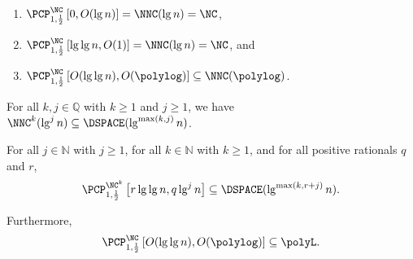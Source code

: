 \documentclass[]{article}
\newcommand{\PCPcs}[5]{\PCP^{#1}_{#2, #3}\left[#4, #5\right]}
\begin{document}
\begin{corollary}
  \mbox{}
  \begin{enumerate}
  \item $\PCPcs{\NC}{1}{\frac{1}{2}}{0}{O(\lg n)} = \NNC(\lg n) = \NC$,
  \item $\PCPcs{\NC}{1}{\frac{1}{2}}{\lg \lg n}{O(1)} = \NNC(\lg n) = \NC$, and
  \item $\PCPcs{\NC}{1}{\frac{1}{2}}{O(\lg \lg n)}{O(\polylog)} \subseteq \NNC(\polylog)$.
  \end{enumerate}
\end{corollary}

\begin{lemma}
  For all $k, j \in \mathbb{Q}$ with $k \geq 1$ and $j \geq 1$, we have $\NNC^k(\lg^j n) \subseteq \DSPACE(\lg^{\max(k, j)} n)$.
\end{lemma}

\begin{corollary}
  For all $j \in \mathbb{N}$ with $j \geq 1$, for all $k \in \mathbb{N}$ with $k \geq 1$, and for all positive rationals $q$ and $r$,
  \begin{equation*}
    \PCPcs{\NC^k}{1}{\frac{1}{2}}{r \lg \lg n}{q \lg^j n} \subseteq \DSPACE(\lg^{\max(k, r + j)} n).
  \end{equation*}

  Furthermore,
  \begin{equation*}
    \PCPcs{\NC}{1}{\frac{1}{2}}{O(\lg \lg n)}{O(\polylog)} \subseteq \polyL.
  \end{equation*}
\end{corollary}



\end{document}
